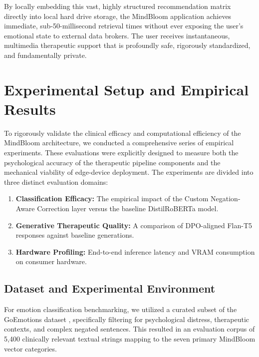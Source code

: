 \documentclass[12pt,twoside]{article}
\begin{document}
By locally embedding this vast, highly structured recommendation matrix directly into local hard drive storage, the MindBloom application achieves immediate, sub-50-millisecond retrieval times without ever exposing the user's emotional state to external data brokers. The user receives instantaneous, multimedia therapeutic support that is profoundly safe, rigorously standardized, and fundamentally private.

\section{Experimental Setup and Empirical Results}

To rigorously validate the clinical efficacy and computational efficiency of the MindBloom architecture, we conducted a comprehensive series of empirical experiments. These evaluations were explicitly designed to measure both the psychological accuracy of the therapeutic pipeline components and the mechanical viability of edge-device deployment. The experiments are divided into three distinct evaluation domains:

\begin{enumerate}[leftmargin=2em]
  \item \textbf{Classification Efficacy:} The empirical impact of the Custom Negation-Aware Correction layer versus the baseline DistilRoBERTa model.
  \item \textbf{Generative Therapeutic Quality:} A comparison of DPO-aligned Flan-T5 responses against baseline generations.
  \item \textbf{Hardware Profiling:} End-to-end inference latency and VRAM consumption on consumer hardware.
\end{enumerate}

\subsection{Dataset and Experimental Environment}

For emotion classification benchmarking, we utilized a curated subset of the GoEmotions dataset \citep{demszky2020goemotions}, specifically filtering for psychological distress, therapeutic contexts, and complex negated sentences. This resulted in an evaluation corpus of 5,400 clinically relevant textual strings mapping to the seven primary MindBloom vector categories.
\end{document}
